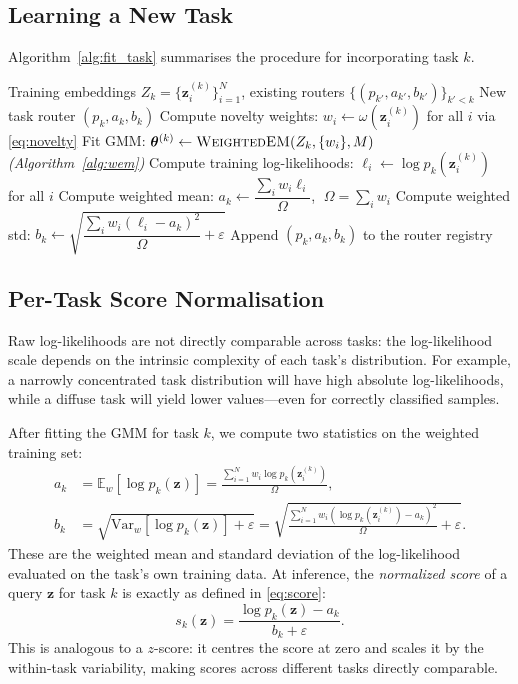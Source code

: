 \documentclass[12pt,a4paper]{article}
\begin{document}
\subsection{Learning a New Task}

Algorithm~\ref{alg:fit_task} summarises the procedure for incorporating task $k$.

\begin{algorithm}[t]
\caption{Fitting Task $k$ in the Continual Router}
\label{alg:fit_task}
\begin{algorithmic}[1]
\Require Training embeddings $Z_k = \{\mathbf{z}_i^{(k)}\}_{i=1}^N$, existing routers $\{(p_{k'}, a_{k'}, b_{k'})\}_{k'<k}$
\Ensure New task router $(p_k, a_k, b_k)$
\State Compute novelty weights: $w_i \gets \omega(\mathbf{z}_i^{(k)})$ for all $i$ via \eqref{eq:novelty}
\State Fit GMM: $\bm{\theta}^{(k)} \gets \textsc{WeightedEM}(Z_k, \{w_i\}, M)$ \hfill\textit{(Algorithm~\ref{alg:wem})}
\State Compute training log-likelihoods: $\ell_i \gets \log p_k(\mathbf{z}_i^{(k)})$ for all $i$
\State Compute weighted mean: $a_k \gets \dfrac{\sum_i w_i \ell_i}{\Omega}$, $\; \Omega = \sum_i w_i$
\State Compute weighted std: $b_k \gets \sqrt{\dfrac{\sum_i w_i (\ell_i - a_k)^2}{\Omega} + \varepsilon}$
\State Append $(p_k, a_k, b_k)$ to the router registry
\end{algorithmic}
\end{algorithm}

\subsection{Per-Task Score Normalisation}
\label{sec:norm}

Raw log-likelihoods are not directly comparable across tasks: the log-likelihood scale depends on the intrinsic complexity of each task's distribution.
For example, a narrowly concentrated task distribution will have high absolute log-likelihoods, while a diffuse task will yield lower values---even for correctly classified samples.

After fitting the GMM for task $k$, we compute two statistics on the weighted training set:
\begin{align}
    a_k &= \mathbb{E}_w\!\left[\log p_k(\mathbf{z})\right]
         = \frac{\sum_{i=1}^N w_i \log p_k(\mathbf{z}_i^{(k)})}{\Omega},
         \label{eq:ak} \\
    b_k &= \sqrt{\mathrm{Var}_w\!\left[\log p_k(\mathbf{z})\right] + \varepsilon}
         = \sqrt{\frac{\sum_{i=1}^N w_i (\log p_k(\mathbf{z}_i^{(k)}) - a_k)^2}{\Omega} + \varepsilon}.
         \label{eq:bk}
\end{align}
These are the weighted mean and standard deviation of the log-likelihood evaluated on the task's own training data.
At inference, the \emph{normalized score} of a query $\mathbf{z}$ for task $k$ is exactly as defined in \eqref{eq:score}:
\begin{equation}
    s_k(\mathbf{z}) = \frac{\log p_k(\mathbf{z}) - a_k}{b_k + \varepsilon}.
    \label{eq:snorm}
\end{equation}
This is analogous to a $z$-score: it centres the score at zero and scales it by the within-task variability, making scores across different tasks directly comparable.
\end{document}
